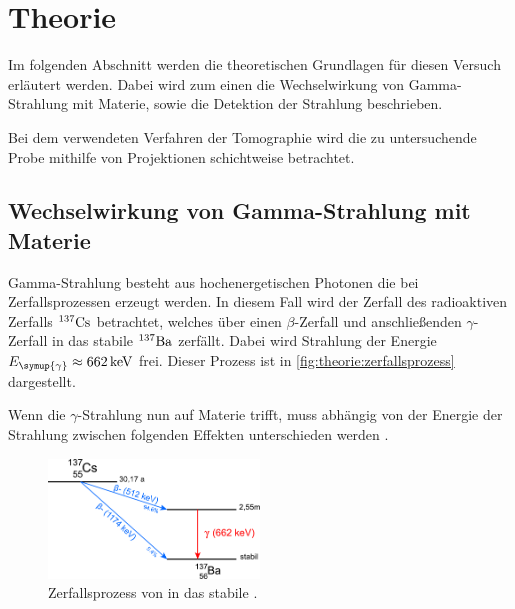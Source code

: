 \section{Theorie}
\label{sec:theorie}

    Im folgenden Abschnitt werden die theoretischen Grundlagen für diesen Versuch erläutert werden.
    Dabei wird zum einen die Wechselwirkung von Gamma-Strahlung mit Materie,
    sowie die Detektion der Strahlung beschrieben.

    Bei dem verwendeten Verfahren der Tomographie wird die zu untersuchende Probe mithilfe von Projektionen schichtweise betrachtet.

\subsection{Wechselwirkung von Gamma-Strahlung mit Materie}

    Gamma-Strahlung besteht aus hochenergetischen Photonen die bei Zerfallsprozessen erzeugt werden.
    In diesem Fall wird der Zerfall des radioaktiven Zerfalls $^{137}\ce{Cs}$ betrachtet,
    welches über einen $\beta$-Zerfall und anschließenden $\gamma$-Zerfall in das stabile $^{137}\ce{Ba}$ zerfällt.
    Dabei wird Strahlung der Energie $E_{\symup{\gamma}} \approx \SI{662}{\kilo\eV}$ \cite{caesium} frei.
    Dieser Prozess ist in \autoref{fig:theorie:zerfallsprozess} dargestellt.

    Wenn die $\gamma$-Strahlung nun auf Materie trifft,
    muss abhängig von der Energie der Strahlung zwischen folgenden Effekten unterschieden werden \cite{radioaktivitaet}.

    \begin{figure}
       \centering
       \includegraphics[width=0.5\textwidth]{content/img/zerfallsschema_Leifi.pdf}
       \caption{Zerfallsprozess von  in das stabile . \cite{caesium}}
       \label{fig:theorie:zerfallsprozess}
    \end{figure}

